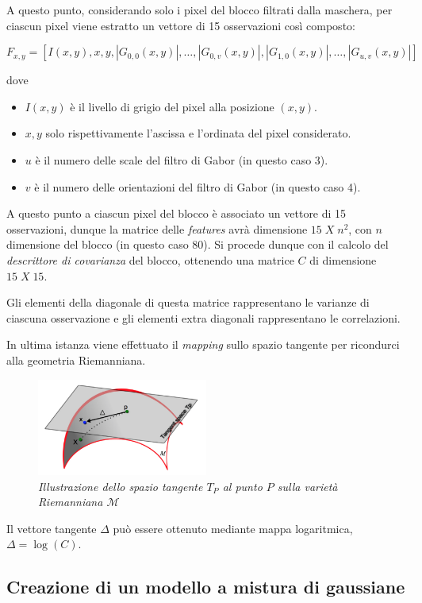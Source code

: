 A questo punto, considerando solo i pixel del blocco filtrati dalla maschera, per ciascun pixel viene estratto un vettore di 15 osservazioni così composto:

$$F_{x,y} = [I(x, y), x, y, |G_{0,0}(x, y)|, \ldots, |G_{0, v}(x, y)|, |G_{1, 0}(x, y)|, \ldots, |G_{u, v}(x, y)|]$$

dove 
\begin{itemize}
\item $I(x, y)$ è il livello di grigio del pixel alla posizione $(x, y)$.
\item $x, y$ solo rispettivamente l'ascissa e l'ordinata del pixel considerato.
\item $u$ è il numero delle scale del filtro di Gabor (in questo caso 3).
\item $v$ è il numero delle orientazioni del filtro di Gabor (in questo caso 4).
\end{itemize}

A questo punto a ciascun pixel del blocco è associato un vettore di 15 osservazioni, dunque la matrice delle \emph{features} avrà dimensione $15\; X\; n^2$, con $n$ dimensione del blocco (in questo caso 80).
Si procede dunque con il calcolo del \emph{descrittore di covarianza} del blocco, ottenendo una matrice $C$ di dimensione $15 \; X \; 15$.

Gli elementi della diagonale di questa matrice rappresentano le varianze di ciascuna osservazione e gli elementi extra diagonali rappresentano le correlazioni. 

In ultima istanza viene effettuato il \emph{mapping} sullo spazio tangente per ricondurci alla geometria Riemanniana.

\begin{figure}[H] 
  \centering
    \includegraphics[width=0.5\textwidth]{images/tangent_space.png}
    \caption{{\textit{Illustrazione dello spazio tangente $T_P$ al punto $P$ sulla varietà Riemanniana $\mathcal{M}$}}}
\end{figure}

Il vettore tangente $\Delta$ può essere ottenuto mediante mappa logaritmica, $\Delta = \log(C)$.

\subsection{Creazione di un modello a mistura di gaussiane}


